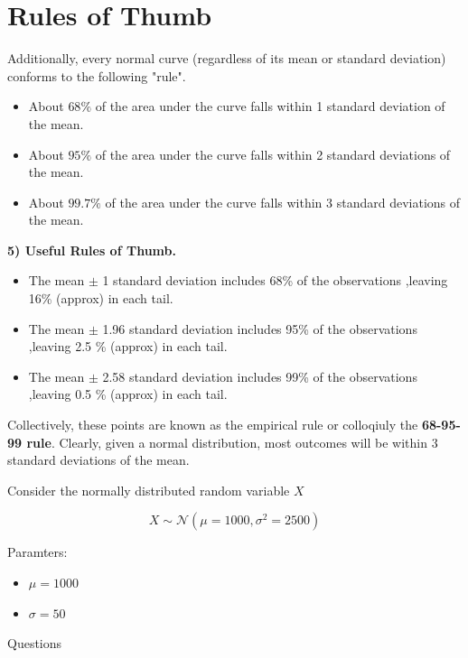 \documentclass[]{report}
\begin{document}
\section{Rules of Thumb}
Additionally, every normal curve (regardless of its mean or standard deviation) conforms to the following "rule".

\begin{itemize}
	\item About $68\%$ of the area under the curve falls within 1 standard deviation of the mean.
	\item About $95\%$ of the area under the curve falls within 2 standard deviations of the mean.
	\item About $99.7\%$ of the area under the curve falls within 3 standard deviations of the mean.
\end{itemize}
\textbf{5) Useful Rules of Thumb.}

\begin{itemize}
	\item	The mean $\pm$  1 standard deviation includes 68\% of the observations ,leaving 16\% (approx) in each tail.
	
	\item	The mean $\pm$  1.96 standard deviation includes 95\% of the observations ,leaving 2.5 \% (approx) in each tail.
	
	\item 	The mean $\pm$  2.58 standard deviation includes 99\% of the observations ,leaving 0.5 \% (approx) in each tail.
\end{itemize}


Collectively, these points are known as the empirical rule or colloqiuly the \textbf{68-95-99 rule}. Clearly, given a normal distribution, most outcomes will be within 3 standard deviations of the mean.








Consider the normally distributed random variable $X$

\[ X \sim \mathcal{N}(\mu=1000,\sigma^2 = 2500) \]

Paramters:
\begin{itemize}
	\item $\mu =1000$
	\item $\sigma =50$
\end{itemize}
Questions
\end{document}
